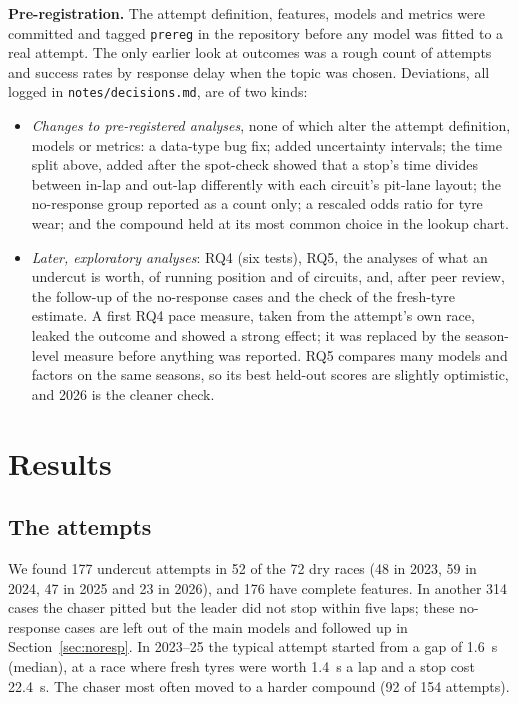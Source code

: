 \documentclass[12pt]{article}
\begin{document}
\textbf{Pre-registration.} The attempt definition, features, models and metrics were committed and tagged \texttt{prereg} in the repository before any model was fitted to a real attempt. The only earlier look at outcomes was a rough count of attempts and success rates by response delay when the topic was chosen. Deviations, all logged in \texttt{notes/decisions.md}, are of two kinds:
\begin{itemize}
\item \emph{Changes to pre-registered analyses}, none of which alter the attempt definition, models or metrics: a data-type bug fix; added uncertainty intervals; the time split above, added after the spot-check showed that a stop's time divides between in-lap and out-lap differently with each circuit's pit-lane layout; the no-response group reported as a count only; a rescaled odds ratio for tyre wear; and the compound held at its most common choice in the lookup chart.
\item \emph{Later, exploratory analyses}: RQ4 (six tests), RQ5, the analyses of what an undercut is worth, of running position and of circuits, and, after peer review, the follow-up of the no-response cases and the check of the fresh-tyre estimate. A first RQ4 pace measure, taken from the attempt's own race, leaked the outcome and showed a strong effect; it was replaced by the season-level measure before anything was reported. RQ5 compares many models and factors on the same seasons, so its best held-out scores are slightly optimistic, and 2026 is the cleaner check.
\end{itemize}

\section{Results}

\subsection{The attempts}
We found 177 undercut attempts in 52 of the 72 dry races (48 in 2023, 59 in 2024, 47 in 2025 and 23 in 2026), and 176 have complete features. In another 314 cases the chaser pitted but the leader did not stop within five laps; these no-response cases are left out of the main models and followed up in Section~\ref{sec:noresp}. In 2023--25 the typical attempt started from a gap of 1.6~s (median), at a race where fresh tyres were worth 1.4~s a lap and a stop cost 22.4~s. %
The chaser most often moved to a harder compound (92 of 154 attempts).
\end{document}
